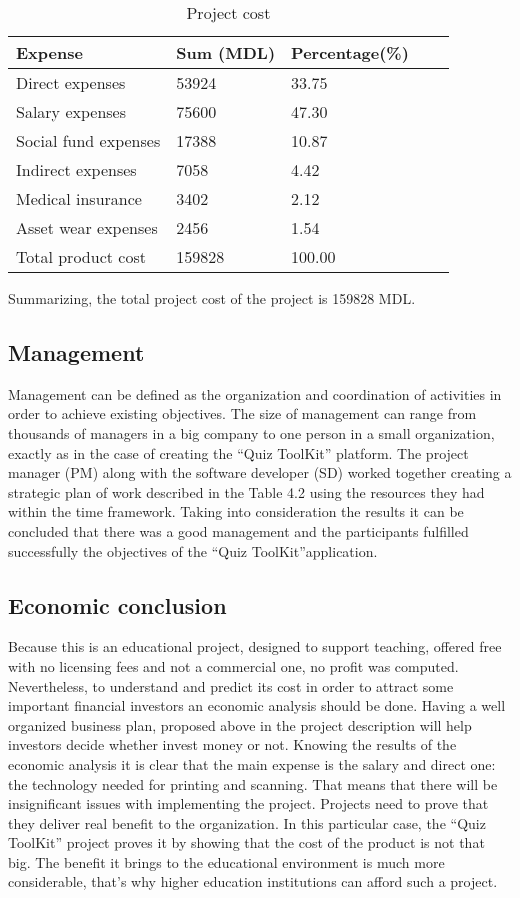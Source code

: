 \begin{table}[ht!]
\centering
\caption{Project cost}
{
\renewcommand{\arraystretch}{1.25}
\begin{tabular}{ lllll }
\hline
  Expense &  Sum (MDL) & Percentage(\%) \\ \hline
  Direct expenses & 53924 & 33.75 \\
  Salary expenses & 75600 & 47.30 \\
  Social fund expenses & 17388 & 10.87 \\
  Indirect expenses & 7058 & 4.42 \\
  Medical insurance & 3402 & 2.12 \\
  Asset wear expenses & 2456 & 1.54 \\ \hline
  Total product cost & 159828 & 100.00 \\
\end{tabular}
}
\label{project_cost}
\end{table}


Summarizing, the total project cost of the project is 159828 MDL. 

\subsection{Management}
Management can be defined as the organization and coordination of activities in order to achieve existing objectives. The size of management can range from thousands of managers in a big company to one person in a small organization, exactly as in the case of creating the “Quiz ToolKit” platform. The project manager (PM) along with the software developer (SD) worked together creating a strategic plan of work described in the Table 4.2 using the resources they had within the time framework. Taking into consideration the results it can be concluded that there was a good management and the participants fulfilled successfully the objectives of the “Quiz ToolKit”application. 

\subsection{Economic conclusion}
Because this is an educational project, designed to support teaching, offered free with no licensing fees and not a commercial one, no profit was computed. Nevertheless, to understand and predict its cost in order to attract some important financial investors an economic analysis should be done. Having a well organized business plan, proposed above in the project description will help investors decide whether invest money or not.  Knowing the results of the economic analysis it is clear that the main expense is the salary and direct one: the technology needed for printing and scanning. That means that there will be insignificant issues with implementing the project.
Projects need to prove that they deliver real benefit to the organization. In this particular case, the “Quiz ToolKit” project proves it by showing that the cost of the product is not that big. The benefit it brings to the educational environment is much more considerable, that’s why higher education institutions can afford such a project.   
